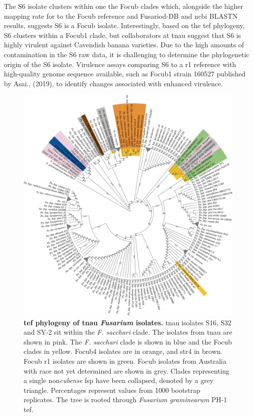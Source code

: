 The S6 isolate clusters within one the \ac{Focub} clades which, alongside the higher mapping rate for to the \ac{Focub} reference and Fusariod-DB and \ac{ncbi} BLASTN results, suggests S6 is a \ac{Focub} isolate. Interestingly, based on the \ac{tef} phylogeny, S6 clusters within a \ac{Focub1} clade, but collaborators at \ac{tnau} suggest that S6 is highly virulent against Cavendish banana varieties. Due to the high amounts of contamination in the S6 raw data, it is challenging to determine the phylogenetic origin of the S6 isolate. Virulence assays comparing S6 to a \ac{r1} reference with high-quality genome sequence available, such as \ac{Focub1} strain 160527 published by Asai., \et (2019), to identify changes associated with enhanced virulence.

\bigskip
\begin{figure}[htp!]
    \centering
    \includegraphics[width=14cm]{Figures/TEF1aPhylo-Including_mindanoense.png}
    \caption[\Acl{tef} phylogeny of \acl{tnau} \textit{Fusarium} isolates.]{\textbf{\Acl{tef} phylogeny of \acl{tnau} \textit{Fusarium} isolates.} \Ac{tnau} isolates S16, S32 and SY-2 sit within the\textit{ F. sacchari} clade. The isolates from \ac{tnau} are shown in pink. The \textit{F. sacchari} clade is shown in blue and the \acl{Focub} clades in yellow. \Acl{Focub4} isolates are in orange, and \ac{str4} in brown. \Ac{Focub} \acl{r1} isolates are shown in green. \ac{Focub} isolates from Australia with race not yet determined are shown in grey. Clades representing a single non\-\textit{cubense} \ac{fsp} have been collapsed, denoted by a grey triangle.  Percentages represent values from 1000 bootstrap replicates. The tree is rooted through \textit{Fusarium graminearum} PH-1 \ac{tef}.}
    \label{fig:TEF1aPhylo}
\end{figure}
\bigskip

